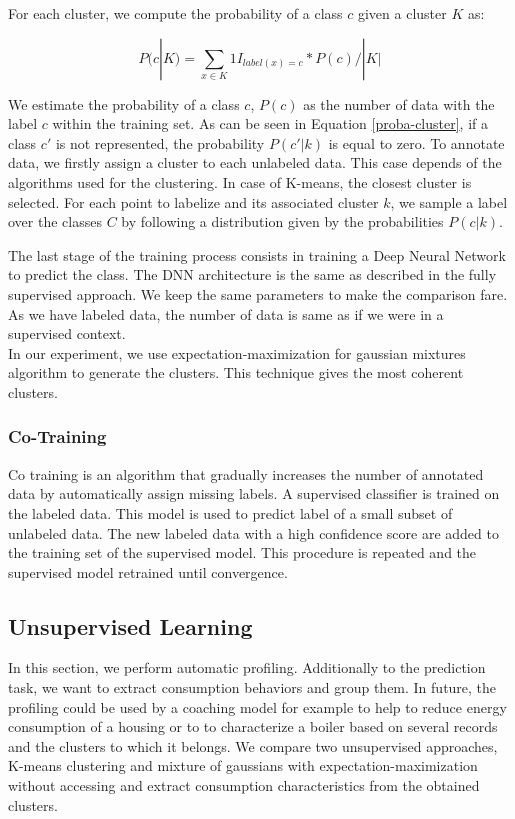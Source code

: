 \documentclass{llncs}
\begin{document}
For each cluster, we compute the probability of a class $c$ given a cluster $K$ as:

\begin{equation}
\label{proba-cluster}
P(c|K) = \sum\limits_{x\in K} 1I_{label(x)=c}*P(c) /|K|
\end{equation}

We estimate the probability of a class $c$, $P(c)$ as the number of data with the label $c$ within the training set. As can be seen in Equation \ref{proba-cluster}, if a class $c'$ is not represented, the probability $P(c'|k)$ is equal to zero. 
To annotate data, we firstly assign a cluster to each unlabeled data. This case depends of the algorithms used for the clustering. In case of K-means, the closest cluster is selected.
For each point to labelize and its associated cluster $k$, we sample a label over the classes $C$ by following a distribution given by the probabilities $P(c|k)$.

The last stage of the training process consists in training a Deep Neural Network to predict the class. The DNN architecture is the same as described in the fully supervised approach. We keep the same parameters to make the comparison fare.
As we have labeled data, the number of data is same as if we were in a supervised context. 
\\In our experiment, we use expectation-maximization for gaussian mixtures algorithm to generate the clusters. This technique gives the most coherent clusters.  

\subsubsection{Co-Training}
Co training is an algorithm that gradually increases the number of annotated data by automatically assign missing labels.
A supervised classifier is trained on the labeled data. This model is used to predict label of a small subset of unlabeled data. The new labeled data with a high confidence score are added to the training set of the supervised model.
This procedure is repeated and the supervised model retrained until convergence. 

\subsection{Unsupervised Learning}

In this section, we perform automatic profiling.
Additionally to the prediction task, we want to extract consumption behaviors and group them. In future, the profiling could be used by a coaching model for example to help to reduce energy consumption of a housing or to to characterize a boiler based on several records and the clusters to which it belongs.  
We compare two unsupervised approaches, K-means clustering and mixture of gaussians with expectation-maximization without accessing and extract consumption characteristics from the obtained clusters. 
\end{document}
